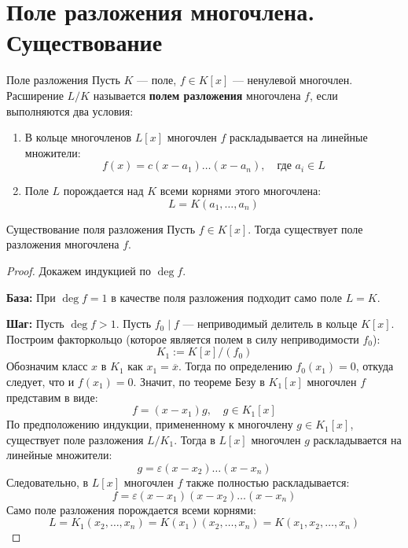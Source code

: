 
\section{Поле разложения многочлена. Существование}

\begin{Definition}{Поле разложения}{}
	Пусть $K$ --- поле, $f \in K[x]$ --- ненулевой многочлен. Расширение $L/K$ называется \textbf{полем разложения} многочлена $f$, если выполняются два условия:
	\begin{enumerate}
		\item В кольце многочленов $L[x]$ многочлен $f$ раскладывается на линейные множители:
		\[ f(x) = c(x-a_1)\dots(x-a_n), \quad \text{где } a_i \in L \]
		\item Поле $L$ порождается над $K$ всеми корнями этого многочлена:
		\[ L = K(a_1, \dots, a_n) \]
	\end{enumerate}
\end{Definition}

\begin{Theorem}{Существование поля разложения}{}
	Пусть $f \in K[x]$. Тогда существует поле разложения многочлена $f$.
\end{Theorem}

\begin{proof}
	Докажем индукцией по $\deg f$.

	\textbf{База:} При $\deg f = 1$ в качестве поля разложения подходит само поле $L = K$.

	\textbf{Шаг:} Пусть $\deg f > 1$. Пусть $f_0 \mid f$ --- неприводимый делитель в кольце $K[x]$. Построим факторкольцо (которое является полем в силу неприводимости $f_0$):
	\[ K_1 := K[x]/(f_0) \]
	Обозначим класс $x$ в $K_1$ как $x_1 = \overline{x}$. Тогда по определению $f_0(x_1) = 0$, откуда следует, что и $f(x_1) = 0$.
	Значит, по теореме Безу в $K_1[x]$ многочлен $f$ представим в виде:
	\[ f = (x - x_1)g, \quad g \in K_1[x] \]
	По предположению индукции, примененному к многочлену $g \in K_1[x]$, существует поле разложения $L/K_1$. Тогда в $L[x]$ многочлен $g$ раскладывается на линейные множители:
	\[ g = \varepsilon(x - x_2) \dots (x - x_n) \]
	Следовательно, в $L[x]$ многочлен $f$ также полностью раскладывается:
	\[ f = \varepsilon(x - x_1)(x - x_2) \dots (x - x_n) \]
	Само поле разложения порождается всеми корнями:
	\[ L = K_1(x_2, \dots, x_n) = K(x_1)(x_2, \dots, x_n) = K(x_1, x_2, \dots, x_n) \]
\end{proof}
